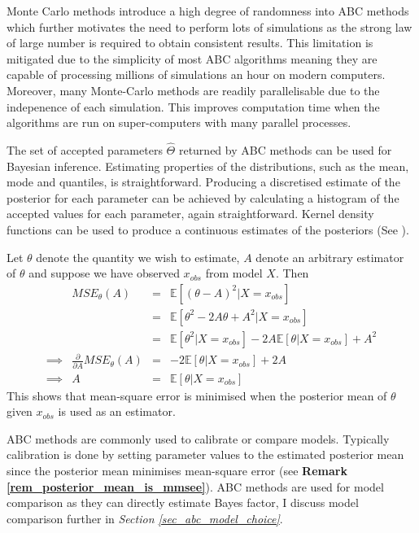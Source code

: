 \documentclass[11pt,a4paper]{article}
\newcommand*{\expect}{\mathbb{E}}
\theoremstyle{break}
\begin{document}
  \par Monte Carlo methods introduce a high degree of randomness into ABC methods which further motivates the need to perform lots of simulations as the strong law of large number is required to obtain consistent results. This limitation is mitigated due to the simplicity of most ABC algorithms meaning they are capable of processing millions of simulations an hour on modern computers. Moreover, many Monte-Carlo methods are readily parallelisable due to the indepenence of each simulation. This improves computation time when the algorithms are run on super-computers with many parallel processes.

  \par The set of accepted parameters $\hat\Theta$ returned by ABC methods can be used for Bayesian inference. Estimating properties of the distributions, such as the mean, mode and quantiles, is straightforward. Producing a discretised estimate of the posterior for each parameter can be achieved by calculating a histogram of the accepted values for each parameter, again straightforward. Kernel density functions can be used to produce a continuous estimates of the posteriors (See \cite[]{review_of_kde}).

  \begin{box_remark}\label{rem_posterior_mean_is_mmsee}
    Let $\theta$ denote the quantity we wish to estimate, $A$ denote an arbitrary estimator of $\theta$ and suppose we have observed $x_{obs}$ from model $X$. Then
    \[\begin{array}{rrcl}
      &MSE_\theta(A)&=&\expect\left[(\theta-A)^2|X=x_{obs}\right]\\
      &&=&\expect\left[\theta^2-2A\theta+A^2|X=x_{obs}\right]\\
      &&=&\expect\left[\theta^2|X=x_{obs}\right]-2A\expect\left[\theta|X=x_{obs}\right]+A^2\\
      \implies&\frac{\partial}{\partial A}MSE_\theta(A)&=&-2\expect[\theta|X=x_{obs}]+2A\\
      \implies&A&=&\expect[\theta|X=x_{obs}]
    \end{array}\]
    This shows that mean-square error is minimised when the posterior mean of $\theta$ given $x_{obs}$ is used as an estimator.
  \end{box_remark}

  \par ABC methods are commonly used to calibrate or compare models. Typically calibration is done by setting parameter values to the estimated posterior mean since the posterior mean minimises mean-square error (see \textbf{Remark \ref{rem_posterior_mean_is_mmsee}}). ABC methods are used for model comparison as they can directly estimate Bayes factor, I discuss model comparison further in \textit{Section \ref{sec_abc_model_choice}}.
\end{document}
